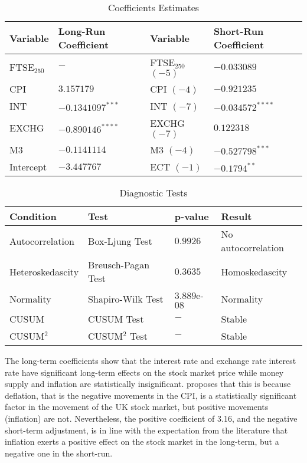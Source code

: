 \documentclass[11pt,a4paper]{article}
\newcommand{\citeboth}[1]{\citeauthor{#1} \citep{#1}}
\begin{document}
\begin{table}[h!]
    \centering
    \caption{Coefficients Estimates}
    \begin{tabular}{llll}
        \toprule
        \textbf{Variable} & \textbf{Long-Run Coefficient} & \textbf{Variable} & \textbf{Short-Run Coefficient} \\
        \midrule
        FTSE$_{250}$ & $-$ & FTSE$_{250}$ $(-5)$  & $-0.033089$ \\
        CPI & $3.157179$ & CPI $(-4)$ & $-0.921235$ \\
        INT & $-0.1341097^{***}$ & INT $(-7)$ & $-0.034572^{****}$\\
        EXCHG &  $-0.890146^{****}$ & EXCHG $(-7)$ & $0.122318$ \\
        M3 & $-0.1141114$ & M3 $(-4)$ & $-0.527798^{***}$ \\
        Intercept & $-3.447767$ & ECT $(-1)$ & $-0.1794^{**}$ \\
        \bottomrule
    \end{tabular}
\end{table}

\begin{table}[h!]
    \centering
    \caption{Diagnostic Tests}
    \begin{tabular}{llll}
        \toprule
        \textbf{Condition} & \textbf{Test} & \textbf{p-value} & \textbf{Result} \\
        \midrule
        Autocorrelation & Box-Ljung Test & $0.9926$ & No autocorrelation \\
        Heteroskedascity & Breusch-Pagan Test & $0.3635$ & Homoskedascity \\
        Normality & Shapiro-Wilk Test & $3.889$e-$08$ & Normality \\
        CUSUM & CUSUM Test & $-$ & Stable \\
        CUSUM$^2$ & CUSUM$^2$ Test & $-$ & Stable \\
        \bottomrule
    \end{tabular}
\end{table}

The long-term coefficients show that the interest rate and exchange rate
interest rate have significant long-term effects on the stock market price
while money supply and inflation are statistically insignificant. \citeboth{neifar2023}
proposes that this is because deflation, that is the negative movements in the 
CPI, is a statistically significant factor in the movement of the UK stock 
market, but positive movements (inflation) are not. Nevertheless, the positive
coefficient of 3.16, and the negative short-term adjustment, is in line with the expectation from the literature that 
inflation exerts a positive effect on the stock market in the long-term, but a negative 
one in the short-run. 
\end{document}
